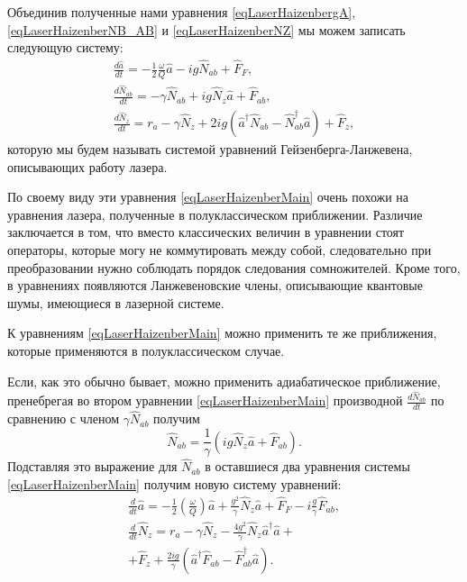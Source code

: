 Объединив полученные нами уравнения \eqref{eqLaserHaizenbergA}, 
\eqref{eqLaserHaizenberNB_AB} и
\eqref{eqLaserHaizenberNZ} мы можем записать следующую 
систему:
\begin{eqnarray}
\frac{d \hat{a}}{d t} = 
- \frac{1}{2}\frac{\omega}{Q}\hat{a}
-i g \hat{N}_{ab} + 
\hat{F}_F,
\nonumber \\
\frac{d \hat{N}_{ab}}{d t} = 
- \gamma \hat{N}_{ab} 
+ i g \hat{N}_{z} \hat{a} 
 + \hat{F}_{ab},
\nonumber \\
\frac{d \hat{N}_z}{d t} = r_a
- \gamma \hat{N}_{z} +
2 i g 
 \left(
\hat{a}^{\dag}\hat{N}_{ab} -
\hat{N}_{ab}^{\dag}\hat{a}
\right) + \hat{F}_{z},
\label{eqLaserHaizenberMain}
\end{eqnarray}
которую мы будем называть системой уравнений Гейзенберга-Ланжевена,
описывающих работу лазера.

По своему виду эти уравнения \eqref{eqLaserHaizenberMain} очень похожи
на уравнения лазера, полученные в полуклассическом
приближении. Различие заключается в том, 
что вместо классических величин в уравнении стоят операторы, которые
могу не коммутировать между собой, следовательно при преобразовании
нужно соблюдать порядок следования сомножителей. Кроме того, в
уравнениях появляются Ланжевеновские члены, описывающие квантовые
шумы, имеющиеся в лазерной системе.

К уравнениям \eqref{eqLaserHaizenberMain}
можно применить те же приближения, которые применяются в
полуклассическом случае.

Если, как это обычно бывает, 
можно применить адиабатическое приближение,
пренебрегая во втором уравнении \eqref{eqLaserHaizenberMain} производной
$\frac{d\hat{N}_{ab}}{d t}$ по сравнению с членом $\gamma
\hat{N}_{ab}$ получим
\begin{equation}
\hat{N}_{ab} = \frac{1}{\gamma} \left(i g \hat{N}_z\hat{a} +
\hat{F}_{ab}\right).
\nonumber
\end{equation}
Подставляя это выражение для $\hat{N}_{ab}$ в оставшиеся два уравнения
системы \eqref{eqLaserHaizenberMain} получим новую
систему уравнений:
\begin{eqnarray}
\frac{d}{dt} \hat{a} = -
\frac{1}{2}\left(\frac{\omega}{Q}\right)\hat{a} + \frac{g^2}{\gamma}
\hat{N}_z\hat{a} + \hat{F}_F - i\frac{g}{\gamma}\hat{F}_{ab},
\nonumber \\
\frac{d}{dt}\hat{N}_z = r_a -
\gamma\hat{N}_z - \frac{4g^2}{\gamma}
\hat{N}_z\hat{a}^{\dag}\hat{a} +
\nonumber \\
+ \hat{F}_z + \frac{2ig}{\gamma} \left(\hat{a}^{\dag}\hat{F}_{ab} -
\hat{F}_{ab}^{\dag}\hat{a}\right).
\label{eqLaserHaizenberg16add}
\end{eqnarray}

